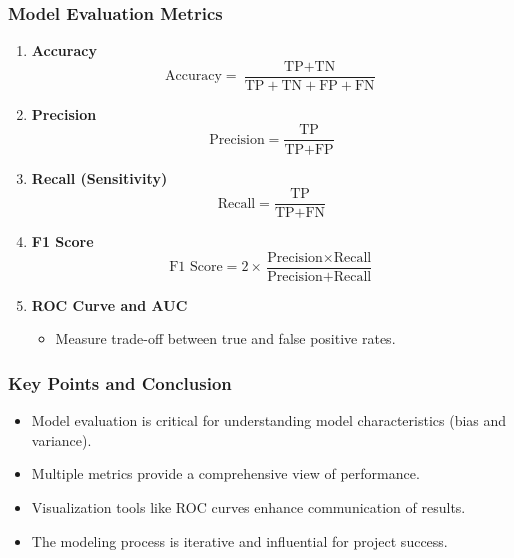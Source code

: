 \documentclass{beamer}
\begin{document}
\begin{frame}[fragile]
    \frametitle{Model Evaluation Metrics}
    \begin{enumerate}
        \item \textbf{Accuracy}
            \begin{equation}
            \text{Accuracy} = \frac{\text{TP} + \text{TN}}{\text{TP} + \text{TN} + \text{FP} + \text{FN}}
            \end{equation}
        \item \textbf{Precision}
            \begin{equation}
            \text{Precision} = \frac{\text{TP}}{\text{TP} + \text{FP}}
            \end{equation}
        \item \textbf{Recall (Sensitivity)}
            \begin{equation}
            \text{Recall} = \frac{\text{TP}}{\text{TP} + \text{FN}}
            \end{equation}
        \item \textbf{F1 Score}
            \begin{equation}
            \text{F1 Score} = 2 \times \frac{\text{Precision} \times \text{Recall}}{\text{Precision} + \text{Recall}}
            \end{equation}
        \item \textbf{ROC Curve and AUC}
            \begin{itemize}
                \item Measure trade-off between true and false positive rates.
            \end{itemize}
    \end{enumerate}
\end{frame}

\begin{frame}[fragile]
    \frametitle{Key Points and Conclusion}
    \begin{itemize}
        \item Model evaluation is critical for understanding model characteristics (bias and variance).
        \item Multiple metrics provide a comprehensive view of performance.
        \item Visualization tools like ROC curves enhance communication of results.
        \item The modeling process is iterative and influential for project success.
    \end{itemize}
\end{frame}
\end{document}
